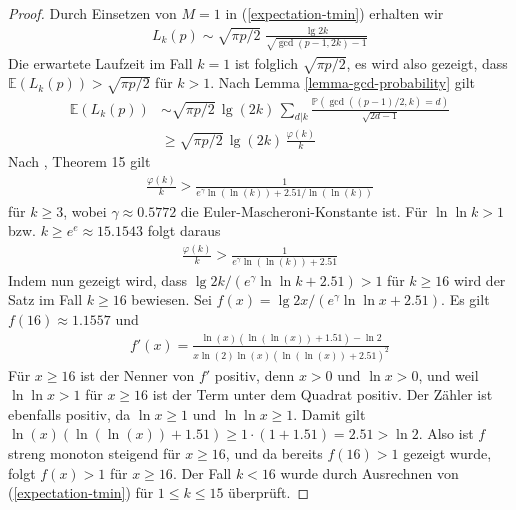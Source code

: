 \documentclass[a4paper, 10pt, ngerman]{article}
\newcommand{\E}{\mathbb{E}}
\renewcommand{\P}{\mathbb{P}}
\begin{document}
\begin{proof}
    Durch Einsetzen von $M = 1$ in (\ref{expectation-tmin}) erhalten wir
    \begin{align*}
        L_k(p) \sim \sqrt {\pi p / 2} \;
        \frac {\lg 2k} {\sqrt{\gcd(p - 1, 2k) - 1}}
    \end{align*}
    Die erwartete Laufzeit im Fall $k = 1$ ist folglich $\sqrt{\pi p/2}$, es wird also gezeigt, dass $\E(L_k(p)) > \sqrt{\pi p / 2}$ für $k > 1$. Nach Lemma \ref{lemma-gcd-probability} gilt
    \begin{align*}
        \E(L_k(p))
         & \sim \sqrt{\pi p / 2} \, \lg (2k) \,
        \sum_{d | k} \frac {\P(\gcd((p - 1)/2, k) = d)}
        { \sqrt {2d - 1}} \nonumber                                 \\
         & \ge \sqrt{\pi p / 2} \, \lg (2k) \, \frac {\varphi(k)} k
    \end{align*}
    Nach \cite{rs62}, Theorem 15 gilt
    \begin{align*}
        \frac {\varphi(k)} k
        > \frac 1 {e^\gamma \ln (\ln (k)) + 2.51 / \ln (\ln (k))}
    \end{align*}
    für $k \ge 3$, wobei $\gamma \approx 0.5772$ die Euler-Mascheroni-Konstante ist. Für $\ln \ln k > 1$ bzw. $k \ge e^e \approx 15.1543$ folgt daraus
    \begin{align*}
        \frac {\varphi(k)} k > \frac 1 {e^\gamma \ln (\ln (k)) + 2.51}
    \end{align*}
    Indem nun gezeigt wird, dass $\lg 2k / (e^\gamma \ln \ln k + 2.51) > 1$ für $k \ge 16$ wird der Satz im Fall $k \ge 16$ bewiesen. Sei $f(x) = \lg 2x / (e^\gamma \ln \ln x + 2.51)$. Es gilt $f(16) \approx 1.1557$ und
    \begin{align*}
        f'(x)
        = \frac {\ln (x)(\ln (\ln (x)) + 1.51) - \ln 2}
        {x \ln (2) \ln (x)(\ln(\ln(x)) + 2.51)^2}
    \end{align*}
    Für $x \ge 16$ ist der Nenner von $f'$ positiv, denn $x > 0$ und $\ln x > 0$, und weil $\ln \ln x > 1$ für $x \ge 16$ ist der Term unter dem Quadrat positiv. Der Zähler ist ebenfalls positiv, da $\ln x \ge 1$ und $\ln \ln x \ge 1$. Damit gilt $\ln(x)(\ln(\ln(x)) + 1.51) \ge 1 \cdot (1 + 1.51) = 2.51 > \ln 2$. Also ist $f$ streng monoton steigend für $x \ge 16$, und da bereits $f(16) > 1$ gezeigt wurde, folgt $f(x) > 1$ für $x \ge 16$. Der Fall $k < 16$ wurde durch Ausrechnen von (\ref{expectation-tmin}) für $1 \le k \le 15$ überprüft.
\end{proof}
\end{document}
